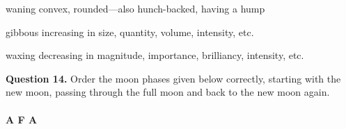 \documentclass[11pt]{article}
\begin{document}
\noindent
\hspace*{1cm} waning \hspace*{3cm} convex, rounded---also hunch-backed, having a hump
\vspace*{0.5cm}

\noindent
\hspace*{1cm} gibbous \hspace*{3cm} increasing in size, quantity, volume, intensity, etc.
\vspace*{0.5cm}

\noindent
\hspace*{1cm} waxing \hspace*{3cm} decreasing in magnitude, importance, brilliancy, intensity, etc.

\newpage
\noindent
\textbf{Question 14.}
Order the moon phases
given below correctly, starting with the new moon, passing through the full
moon and back to the new moon again.\\
\vspace*{0.5cm}\\
\hspace*{1cm}\textbf{A\hspace*{6cm} F \hspace*{6cm} A}\\

\hrulefill\\
\end{document}
